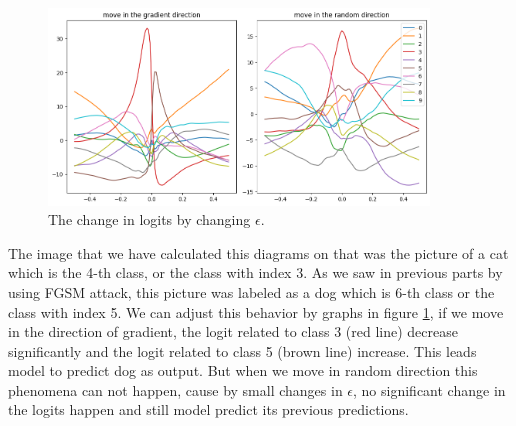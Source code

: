 \documentclass[12]{article}
\begin{document}
\begin{enumerate}
		\begin{figure}[H]
			\centering
			\includegraphics[width=0.9\textwidth]{./figures/logit-epsilon.png}
			\caption{The change in logits by changing $\epsilon$.}
			\label{fig:diagrams}
		\end{figure}
		\noindent
		The image that we have calculated this diagrams on that was the picture of a cat which is the 4-th class, or the class with index 3. As we saw in previous parts by using FGSM attack, this picture was labeled as a dog which is 6-th class or the class with index 5. We can adjust this behavior by graphs in figure \ref{fig:diagrams}, if we move in the direction of gradient, the logit related to class 3 (red line) decrease significantly and the logit related to class 5 (brown line) increase. This leads model to predict dog as output. But when we move in random direction this phenomena can not happen, cause by small changes in $\epsilon$, no significant change in the logits happen and still model predict its previous predictions.
	\end{enumerate}
\end{document}
